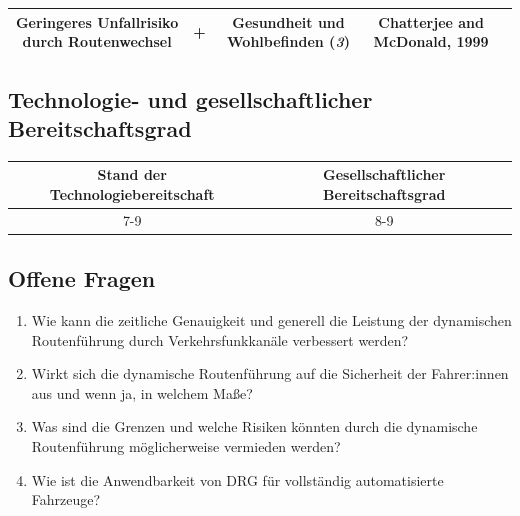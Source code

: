 \documentclass[
]{book}
\providecommand{\tightlist}{%
  \setlength{\itemsep}{0pt}\setlength{\parskip}{0pt}}
\begin{document}
\begin{longtable}[]{@{}ccccc@{}}
\begin{minipage}[t]{0.16\columnwidth}
Geringeres Unfallrisiko durch Routenwechsel\strut
\end{minipage} & \begin{minipage}[t]{0.17\columnwidth}\centering
\textbf{+}\strut
\end{minipage} & \begin{minipage}[t]{0.17\columnwidth}\centering
Gesundheit und Wohlbefinden (\emph{3})\strut
\end{minipage} & \begin{minipage}[t]{0.17\columnwidth}\centering
Chatterjee and McDonald, 1999\strut
\end{minipage}\tabularnewline
\bottomrule
\end{longtable}

\hypertarget{technologie--und-gesellschaftlicher-bereitschaftsgrad-11}{%
\subsection*{Technologie- und gesellschaftlicher Bereitschaftsgrad}\label{technologie--und-gesellschaftlicher-bereitschaftsgrad-11}}

\begin{longtable}[]{@{}cc@{}}
\toprule
Stand der Technologiebereitschaft & Gesellschaftlicher Bereitschaftsgrad\tabularnewline
\midrule
\endhead
7-9 & 8-9\tabularnewline
\bottomrule
\end{longtable}

\hypertarget{offene-fragen-13}{%
\subsection*{Offene Fragen}\label{offene-fragen-13}}

\begin{enumerate}
\def\labelenumi{\arabic{enumi}.}
\tightlist
\item
  Wie kann die zeitliche Genauigkeit und generell die Leistung der dynamischen Routenführung durch Verkehrsfunkkanäle verbessert werden?
\item
  Wirkt sich die dynamische Routenführung auf die Sicherheit der Fahrer:innen aus und wenn ja, in welchem Maße?
\item
  Was sind die Grenzen und welche Risiken könnten durch die dynamische Routenführung möglicherweise vermieden werden?
\item
  Wie ist die Anwendbarkeit von DRG für vollständig automatisierte Fahrzeuge?
\end{enumerate}
\end{document}
